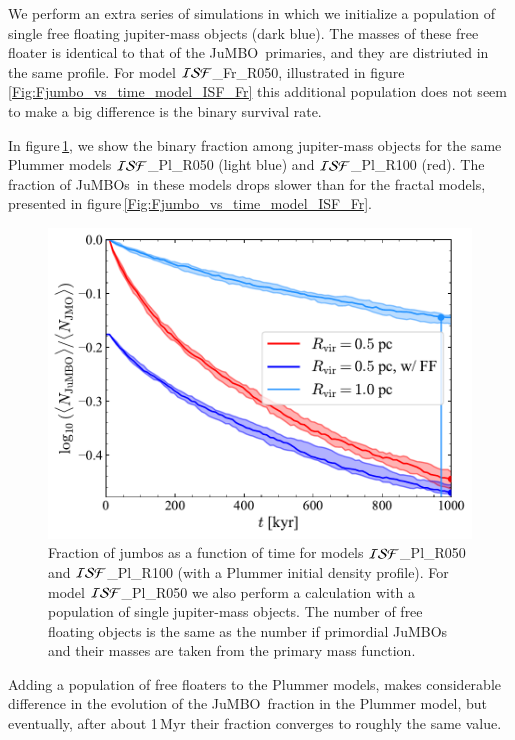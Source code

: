 \documentclass[submission,phys]{lib/SciPost}
\newcommand{\jumbo}{\mbox{JuMBO}}
\newcommand{\jumbos}{\mbox{JuMBOs}}
\begin{document}
We perform an extra series of simulations in which we initialize a
population of single free floating jupiter-mass objects (dark
blue). The masses of these free floater is identical to that of the
\jumbo\, primaries, and they are distriuted in the same profile.  For
model ${\cal ISF}$\_Fr\_R050, illustrated in
figure\,\ref{Fig:Fjumbo_vs_time_model_ISF_Fr} this additional
population does not seem to make a big difference is the binary
survival rate.

In figure\,\ref{Fig:Fjumbo_vs_time_model_ISF_Pl}, we show the binary
fraction among jupiter-mass objects for the same Plummer models ${\cal
  ISF}$\_Pl\_R050 (light blue) and ${\cal ISF}$\_Pl\_R100 (red).  The
fraction of \jumbos\, in these models drops slower than for the
fractal models, presented in
figure\,\ref{Fig:Fjumbo_vs_time_model_ISF_Fr}. 
        
\begin{figure}
    \centering
        \includegraphics[width=\columnwidth]{figures/Plummer_General_fJuMBO_evol.pdf}
        \caption{Fraction of jumbos as a function of time for models
          ${\cal ISF}$\_Pl\_R050 and ${\cal ISF}$\_Pl\_R100 (with a
          Plummer initial density profile). For model ${\cal
            ISF}$\_Pl\_R050 we also perform a calculation with a
          population of single jupiter-mass objects. The number of
          free floating objects is the same as the number if
          primordial \jumbos\, and their masses are taken from the
          primary mass function.}
        \label{Fig:Fjumbo_vs_time_model_ISF_Pl}
\end{figure}

Adding a population of free floaters to the Plummer models, makes
considerable difference in the evolution of the \jumbo\, fraction in
the Plummer model, but eventually, after about 1\,Myr their fraction
converges to roughly the same value.
\end{document}
